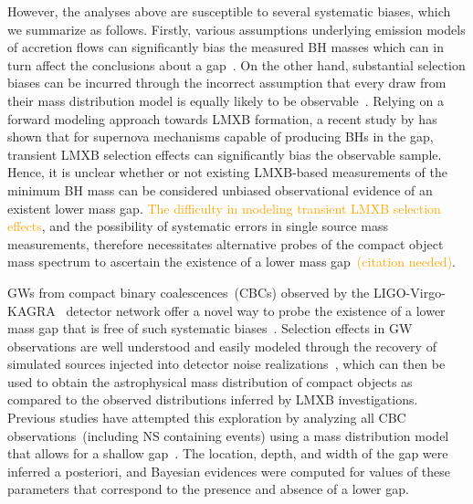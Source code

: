 \documentclass[modern]{aastex631}
\begin{document}


However, the analyses above are susceptible to several systematic biases, which we summarize as follows. Firstly, various assumptions underlying emission models of accretion flows can significantly bias the measured BH masses which can in turn affect the conclusions about a gap~\citep{Kreidberg:2012ud}. On the other hand, substantial selection biases can be incurred through the incorrect assumption that every draw from their mass distribution model is equally likely to be observable~\citep{Farr:2010tu, Siegel:2022gwc}. Relying on a forward modeling approach towards LMXB formation, a recent study by \cite{Siegel:2022gwc} has shown that for supernova mechanisms capable of producing BHs in the gap, transient LMXB selection effects can significantly bias the observable sample. Hence, it is unclear whether or not existing LMXB-based measurements of the minimum BH mass can be considered unbiased observational evidence of an existent lower mass gap. \textcolor{orange}{The difficulty in modeling transient LMXB selection effects}, and the possibility of systematic errors in single source mass measurements, therefore necessitates alternative probes of the compact object mass spectrum to ascertain the existence of a lower mass gap~\textcolor{orange}{(citation needed)}.

GWs from compact binary coalescences~(CBCs) observed by the LIGO-Virgo-KAGRA~\citep[LVK, ][]{LIGOScientific:2014pky, VIRGO:2014yos, KAGRA:2020agh} detector network offer a novel way to probe the existence of a lower mass gap that is free of such systematic biases~\citep{Farah:2021qom,  LIGOScientific:2024elc, KAGRA:2021duu}. Selection effects in GW observations are well understood and easily modeled through the recovery of simulated sources injected into detector noise realizations~\citep{Thrane:2018qnx,Mandel:2018mve,popgw2,popgw3}, which can then be used to obtain the astrophysical mass distribution of compact objects as compared to the observed distributions inferred by LMXB investigations. Previous studies have attempted this exploration by analyzing all CBC observations~(including NS containing events) using a mass distribution model that allows for a shallow gap~\citep{Farah:2021qom,  KAGRA:2021duu, LIGOScientific:2024elc}. The location, depth, and width of the gap were inferred a posteriori, and Bayesian evidences were computed for values of these parameters that correspond to the presence and absence of a lower gap. 
\end{document}
